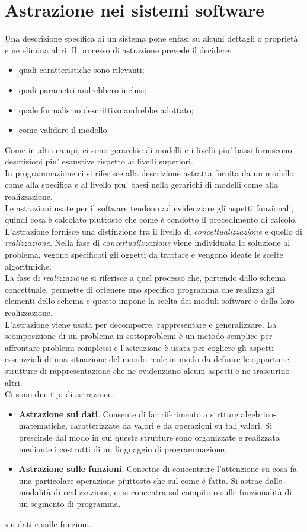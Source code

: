 \documentclass[12pt]{report}
\begin{document}
	\section{Astrazione nei sistemi software}
	Una descrizione specifica di un sistema pone enfasi su alcuni dettagli o proprietà e ne elimina altri. Il processo di astrazione prevede il decidere:
	\begin{itemize}
		\item quali caratteristiche sono rilevanti;
		\item quali parametri andrebbero inclusi;
		\item quale formalismo descrittivo andrebbe adottato;
		\item come validare il modello.
	\end{itemize}
	Come in altri campi, ci sono gerarchie di modelli e i livelli piu' bassi forniscono descrizioni piu' esaustive rispetto ai livelli superiori. \\
	In programmazione ci si riferisce alla descrizione astratta fornita da un modello come alla specifica e al livello piu' bassi nella gerarichi di modelli come alla realizzazione. \\
	Le astrazioni usate per il software tendono ad evidenziare gli aspetti funzionali, quindi cosa è calcolato piuttosto che come è condotto il procedimento di calcolo. \\
	L'astrazione fornisce una distinzione tra il livello di \textit{concettualizzazione} e quello di \textit{realizzazione}. Nella fase di \textit{concettualizzazione} viene individuata la soluzione al problema, vegono specificati gli oggetti da trattare e vengono ideate le scelte algoritmiche. \\
	La fase di \textit{realizzazione} si riferisce a quel processo che, partendo dallo schema concettuale, permette di ottenere uno specifico programma che realizza gli elementi dello schema e  questo impone la scelta dei moduli software e della loro realizzazione. \\
	L'astrazione viene usata per decomporre, rappresentare e generalizzare. La scomposizione di un problema in sottoproblemi è un metodo semplice per affrontare problemi complessi e l'astrazione è usata per cogliere gli aspetti essenzziali di una situazione del mondo reale in modo da definire le opportune strutture di rappresentazione che ne evidenziano alcuni aspetti e ne trascurino altri.\\
	Ci sono due tipi di astrazione:
	\begin{itemize}
		\item \textbf{Astrazione sui dati}. Consente di far riferimento a strtture algebrico-matematiche, caratterizzate da valori e da operazioni su tali valori. Si prescinde dal modo in cui queste strutture sono organizzate e realizzata mediante i costrutti di un linguaggio di programmazione.
		\item \textbf{Astrazione sulle funzioni}. Consetne di concentrare l'attenzione su cosa fa una particolare operazione piuttosto che sul come è fatta. Si astrae dalle modalità di realizzazione, ci si concentra sul compito o sulle funzionalità di un segmento di programma.
	\end{itemize}sui dati e sulle funzioni.
\end{document}

